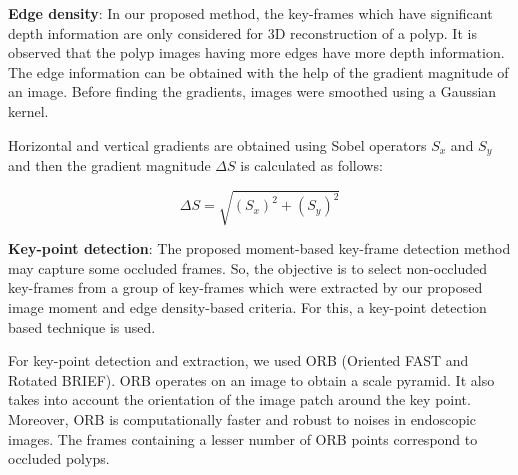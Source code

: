 \documentclass[journal]{IEEEtran}
\begin{document}
\textbf{Edge density}: In our proposed method, the key-frames which have significant depth information are only considered for 3D reconstruction of a polyp. It is observed that the polyp images having more edges have more depth information. The edge information can be obtained with the help of the gradient magnitude of an image. Before finding the gradients, images were smoothed using a Gaussian kernel.

Horizontal and vertical gradients are obtained using Sobel operators $S_x$ and $S_y$ and then the gradient magnitude $\Delta S$ is calculated as follows:

\begin{equation}
\Delta S=\sqrt{(S_{x})^2+(S_{y})^2}
\end{equation}

\textbf{Key-point detection}:
The proposed moment-based key-frame detection method may capture some occluded frames. So, the objective is to select non-occluded key-frames from a group of key-frames which were extracted by our proposed image moment and edge density-based criteria.  For this, a key-point detection based technique is used.

For key-point detection and extraction, we used ORB (Oriented FAST and Rotated BRIEF). ORB operates on an image to obtain a scale pyramid. It also takes into account the orientation of the image patch around the key point. Moreover, ORB is computationally faster and robust to noises in endoscopic images. The frames containing a lesser number of ORB points correspond to occluded polyps. 
\end{document}

